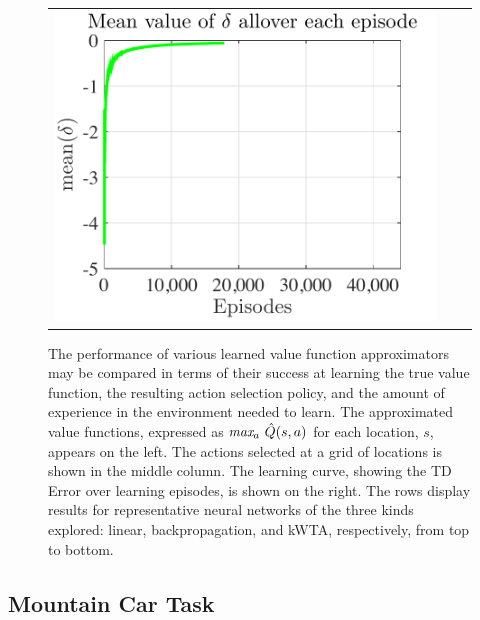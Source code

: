 \documentclass[preprint,12pt,authoryear]{elsarticle}
\begin{document}
\begin{figure}[t]
\begin{center}
\begin{tabular}[h]{ccc}
\includegraphics[scale=0.30]{figures/puddleWorld-kwta-delta.pdf}
\end{tabular}
\end{center}
\caption{The performance of various learned value function
         approximators may be compared in terms of their success at
         learning the true value function, the resulting action
         selection policy, and the amount of experience in the
         environment needed to learn. The approximated value
         functions, expressed as $\mbox{\it max}_{a}\ \hat{Q}(s,a)$
         for each location, $s$, appears on the left. The actions
         selected at a grid of locations is shown in the middle
         column. The learning curve, showing the TD Error over
         learning episodes, is shown on the right. The rows display
         results for representative neural networks of the three kinds
         explored:  linear, backpropagation, and kWTA, respectively,
         from top to bottom.}
\label{bigresults}
\end{figure}



\subsection{Mountain Car Task} %
\label{sub:mountain_car_results}
\end{document}
